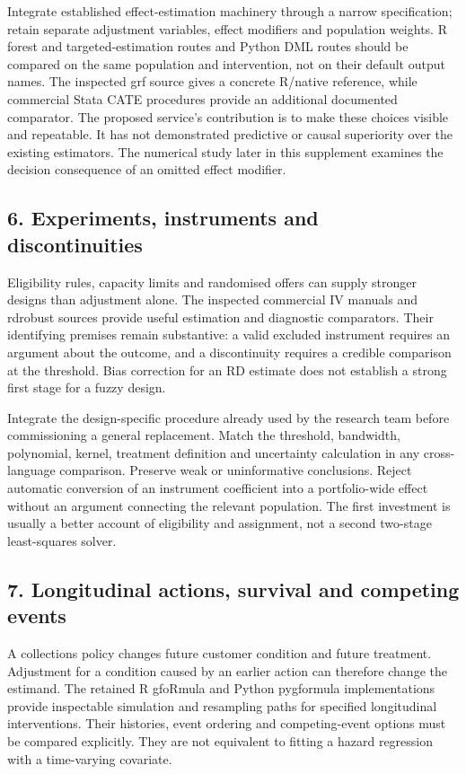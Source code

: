Integrate established effect-estimation machinery through a narrow specification;
retain separate adjustment variables, effect modifiers and population weights.
R forest and targeted-estimation routes and Python DML routes should be compared
on the same population and intervention, not on their default output names.
The inspected grf source gives a concrete R/native reference, while commercial
Stata CATE procedures provide an additional documented comparator.
\citep{exec13_grf_rpath,exec13_ch_stata}
The proposed service's contribution is to make these choices visible and
repeatable. It has not demonstrated predictive or causal superiority over the
existing estimators. The numerical study later in this supplement examines
the decision consequence of an omitted effect modifier.

\subsection{6. Experiments, instruments and discontinuities}
Eligibility rules, capacity limits and randomised offers can supply stronger
designs than adjustment alone. The inspected commercial IV manuals and
rdrobust sources provide useful estimation and diagnostic comparators.
Their identifying premises remain substantive: a valid excluded instrument
requires an argument about the outcome, and a discontinuity requires a
credible comparison at the threshold. Bias correction for an RD estimate does
not establish a strong first stage for a fuzzy design.
\citep{exec13_ivrd_stata,exec13_ivrd_sas,exec13_ivrd_rdrobust}

Integrate the design-specific procedure already used by the research team
before commissioning a general replacement. Match the threshold, bandwidth,
polynomial, kernel, treatment definition and uncertainty calculation in any
cross-language comparison. Preserve weak or uninformative conclusions. Reject
automatic conversion of an instrument coefficient into a portfolio-wide
effect without an argument connecting the relevant population. The first
investment is usually a better account of eligibility and assignment, not a
second two-stage least-squares solver.

\subsection{7. Longitudinal actions, survival and competing events}
A collections policy changes future customer condition and future treatment.
Adjustment for a condition caused by an earlier action can therefore change
the estimand. The retained R gfoRmula and Python pygformula implementations
provide inspectable simulation and resampling paths for specified longitudinal
interventions. Their histories, event ordering and competing-event options
must be compared explicitly. They are not equivalent to fitting a hazard
regression with a time-varying covariate.
\citep{exec20_gformula_reuse,exec24_longpy_pygformula_source,exec14_survival_sas,
exec14_survival_stata_competing}


